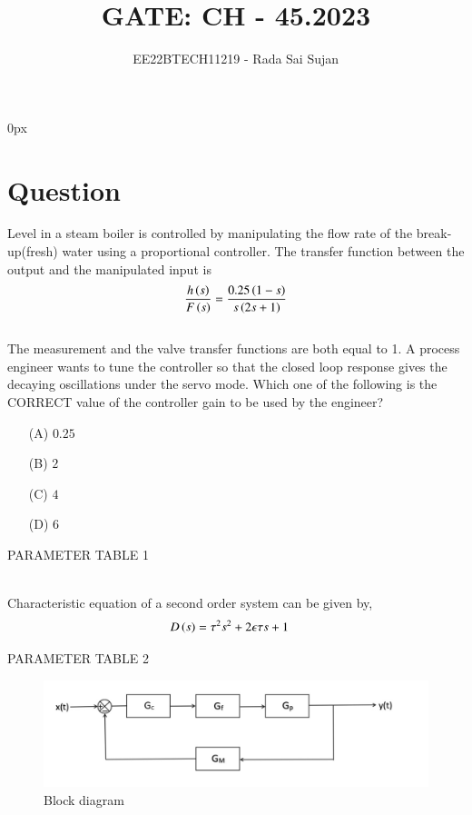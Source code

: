 \documentclass[journal,12pt,twocolumn]{IEEEtran}
\theoremstyle{remark}
\begin{document}
\parindent 0px

\title{GATE: CH - 45.2023}
\author{EE22BTECH11219 - Rada Sai Sujan$^{}$%
}
\maketitle
\newpage
\bigskip
\section*{Question}
Level  in a steam boiler is controlled by manipulating the flow rate  of the break-up(fresh) water using a proportional  controller. The transfer function between the output and the manipulated input is   \\
$$ \frac{h\left(s\right)}{F\left(s\right)}=\frac{0.25\left(1-s\right)}{s\left(2s+1\right)} $$   \\
The measurement and the valve transfer functions are both equal to 1. A process engineer wants to tune the controller so that the closed loop response gives the decaying oscillations under the servo mode. Which one of the following is the CORRECT value of the controller gain to be used by the engineer? \\
\begin{enumerate}
    \item[(A)] $0.25$
    \item[(B)] $2$
    \item[(C)] $4$
    \item[(D)] $6$
\end{enumerate}
\solution
\begin{table}[ht]
    \centering
    
    \caption{PARAMETER TABLE 1}
    \label{tab:ch.45.1}
\end{table} \\
Characteristic equation of a second order system can be given by,
\begin{align}
    D\left(s\right) &= \tau ^2s^2+2\epsilon \tau s+1 \label{eq:x}
\end{align}
\begin{table}[]
    \centering
    
    \caption{PARAMETER TABLE 2}
    \label{tab:ch.45.2}
\end{table}
\begin{figure}[ht]
    \centering
    \includegraphics[width=\columnwidth]{figs/block.png}
    \caption{Block diagram}
    \label{fig:ch.45.1}
\end{figure}    \\
\end{document}
